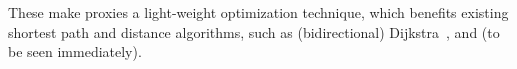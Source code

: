 These make proxies a light-weight optimization technique, which benefits existing shortest  path and distance algorithms, such as (bidirectional) Dijkstra~\cite{LubyR89}, \arcflag \cite{MohringSSWW05} and \tnr \cite{arz2013transit} (to be seen immediately).



\begin{figure}[t!]
\vspace{-1ex}
\begin{center}
\hspace{-4ex}
\hspace{-4ex}\vspace{-1.5ex}

\end{center}
\end{figure}
